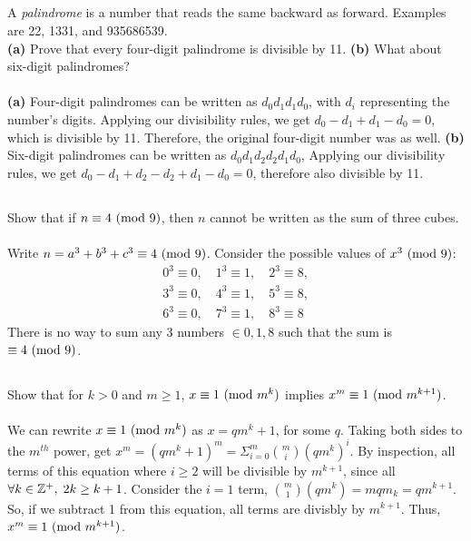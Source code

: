 \documentclass{article}
\begin{document}
\subsection{}
A \textit{palindrome} is a number that reads the same backward as forward.
Examples are 22, 1331, and 935686539.\\
\textbf{(a)} Prove that every four-digit palindrome is divisible by 11.
\textbf{(b)} What about six-digit palindromes?\\~\\
\textbf{(a)}
Four-digit palindromes can be written as $d_0 d_1 d_1 d_0$,
with $d_i$ representing the number's digits.
Applying our divisibility rules, we get $d_0 - d_1 + d_1 - d_0 = 0$,
which is divisible by 11.
Therefore, the original four-digit number was as well.
\textbf{(b)}
Six-digit palindromes can be written as $d_0 d_1 d_2 d_2 d_1 d_0$,
Applying our divisibility rules, we get
$d_0 - d_1 + d_2 - d_2 + d_1 - d_0 = 0$, therefore also divisible by 11.

\subsection{}
Show that if $n \equiv 4 \ (\mathrm{mod}\ 9)$, then $n$ cannot be written as the sum of
three cubes.\\~\\
Write $n = a^3 + b^3 + c^3 \equiv 4 \ (\mathrm{mod}\ 9)$.
Consider the possible values of $x^3 \ (\mathrm{mod}\ 9)$:
\begin{gather*}
    0^3 \equiv 0, \quad 1^3 \equiv 1, \quad 2^3 \equiv 8, \\
    3^3 \equiv 0, \quad 4^3 \equiv 1, \quad 5^3 \equiv 8, \\
    6^3 \equiv 0, \quad 7^3 \equiv 1, \quad 8^3 \equiv 8
\end{gather*}
There is no way to sum any 3 numbers $\in {0, 1, 8}$ such that
the sum is $\equiv 4 \ (\mathrm{mod}\ 9)$.

\subsection{}
Show that for $k > 0$ and $m \geq 1$, $x \equiv 1 \ (\mathrm{mod}\ m^k)$ implies
$x^m \equiv 1 \ (\mathrm{mod}\ m^{k+1})$.\\~\\
We can rewrite $x \equiv 1 \ (\mathrm{mod}\ m^k)$ as $x = qm^k + 1$, for some $q$.
Taking both sides to the $m^{th}$ power, get
$x^m = (qm^k + 1)^m = \Sigma_{i=0}^m {m \choose i} (qm^k)^i$.
By inspection, all terms of this equation where $i \geq 2$ will be divisible by
$m^{k+1}$, since all $\forall k \in \mathbb{Z}^+, \; 2k \geq k + 1$.
Consider the $i = 1$ term, ${m \choose 1} (qm^k) = mqm_k = qm^{k + 1}$.
So, if we subtract 1 from this equation, all terms are divisbly by $m^{k+1}$.
Thus, $x^m \equiv 1 \ (\mathrm{mod}\ m^{k+1})$.
\end{document}
